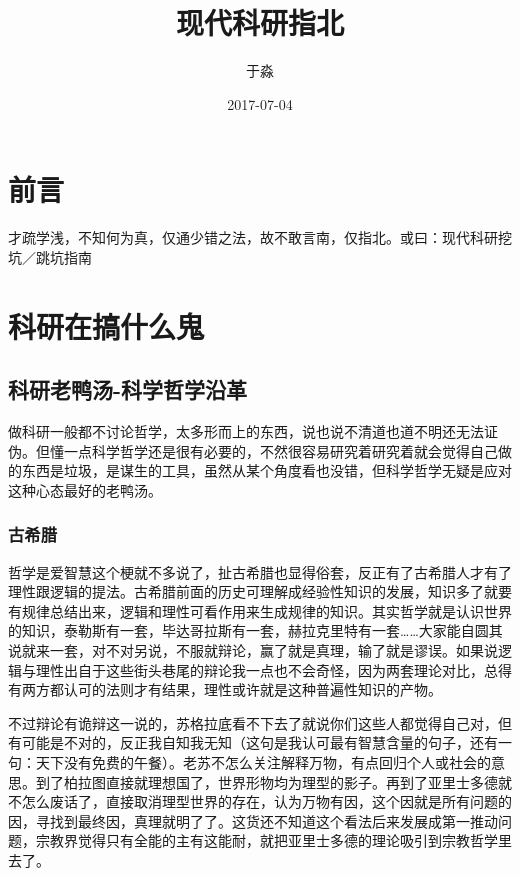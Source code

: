 \documentclass[]{book}
\title{现代科研指北}
\author{于淼}
\date{2017-07-04}
\begin{document}
\maketitle

{
\setcounter{tocdepth}{1}
\tableofcontents
}
\chapter{前言}

才疏学浅，不知何为真，仅通少错之法，故不敢言南，仅指北。或曰：现代科研挖坑／跳坑指南

\chapter{科研在搞什么鬼}\label{intro}

\section{科研老鸭汤-科学哲学沿革}\label{-}

做科研一般都不讨论哲学，太多形而上的东西，说也说不清道也道不明还无法证伪。但懂一点科学哲学还是很有必要的，不然很容易研究着研究着就会觉得自己做的东西是垃圾，是谋生的工具，虽然从某个角度看也没错，但科学哲学无疑是应对这种心态最好的老鸭汤。

\subsection{古希腊}

哲学是爱智慧这个梗就不多说了，扯古希腊也显得俗套，反正有了古希腊人才有了理性跟逻辑的提法。古希腊前面的历史可理解成经验性知识的发展，知识多了就要有规律总结出来，逻辑和理性可看作用来生成规律的知识。其实哲学就是认识世界的知识，泰勒斯有一套，毕达哥拉斯有一套，赫拉克里特有一套\ldots{}\ldots{}大家能自圆其说就来一套，对不对另说，不服就辩论，赢了就是真理，输了就是谬误。如果说逻辑与理性出自于这些街头巷尾的辩论我一点也不会奇怪，因为两套理论对比，总得有两方都认可的法则才有结果，理性或许就是这种普遍性知识的产物。

不过辩论有诡辩这一说的，苏格拉底看不下去了就说你们这些人都觉得自己对，但有可能是不对的，反正我自知我无知（这句是我认可最有智慧含量的句子，还有一句：天下没有免费的午餐）。老苏不怎么关注解释万物，有点回归个人或社会的意思。到了柏拉图直接就理想国了，世界形物均为理型的影子。再到了亚里士多德就不怎么废话了，直接取消理型世界的存在，认为万物有因，这个因就是所有问题的因，寻找到最终因，真理就明了了。这货还不知道这个看法后来发展成第一推动问题，宗教界觉得只有全能的主有这能耐，就把亚里士多德的理论吸引到宗教哲学里去了。
\end{document}
